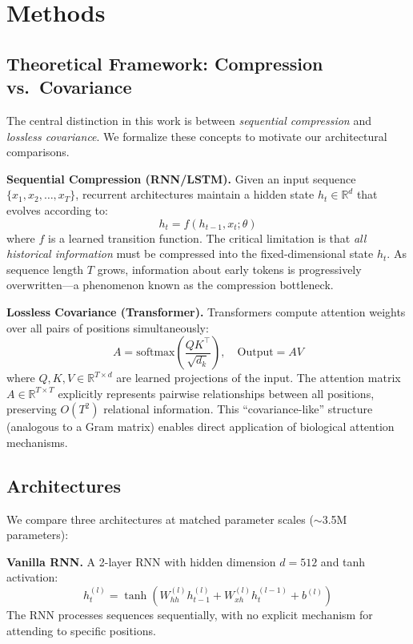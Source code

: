 \section{Methods}

\subsection{Theoretical Framework: Compression vs.\ Covariance}

The central distinction in this work is between \textit{sequential compression} and \textit{lossless covariance}. We formalize these concepts to motivate our architectural comparisons.

\textbf{Sequential Compression (RNN/LSTM).} Given an input sequence $\{x_1, x_2, \ldots, x_T\}$, recurrent architectures maintain a hidden state $h_t \in \mathbb{R}^d$ that evolves according to:
\begin{equation}
h_t = f(h_{t-1}, x_t; \theta)
\end{equation}
where $f$ is a learned transition function. The critical limitation is that \textit{all historical information} must be compressed into the fixed-dimensional state $h_t$. As sequence length $T$ grows, information about early tokens is progressively overwritten---a phenomenon known as the compression bottleneck.

\textbf{Lossless Covariance (Transformer).} Transformers compute attention weights over all pairs of positions simultaneously:
\begin{equation}
A = \text{softmax}\left(\frac{QK^\top}{\sqrt{d_k}}\right), \quad \text{Output} = AV
\end{equation}
where $Q, K, V \in \mathbb{R}^{T \times d}$ are learned projections of the input. The attention matrix $A \in \mathbb{R}^{T \times T}$ explicitly represents pairwise relationships between all positions, preserving $O(T^2)$ relational information. This ``covariance-like'' structure (analogous to a Gram matrix) enables direct application of biological attention mechanisms.

\subsection{Architectures}

We compare three architectures at matched parameter scales ($\sim$3.5M parameters):

\textbf{Vanilla RNN.} A 2-layer RNN with hidden dimension $d=512$ and tanh activation:
\begin{equation}
h_t^{(l)} = \tanh(W_{hh}^{(l)} h_{t-1}^{(l)} + W_{xh}^{(l)} h_t^{(l-1)} + b^{(l)})
\end{equation}
The RNN processes sequences sequentially, with no explicit mechanism for attending to specific positions.

